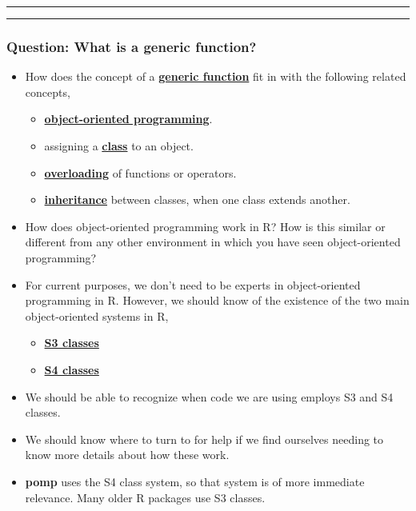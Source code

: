 \documentclass[]{article}
\begin{document}
\begin{center}\rule{0.5\linewidth}{\linethickness}\end{center}

\begin{center}\rule{0.5\linewidth}{\linethickness}\end{center}

\subsubsection{Question: What is a generic
function?}\label{question-what-is-a-generic-function}

\begin{itemize}
\item
  How does the concept of a
  \href{https://en.wikipedia.org/wiki/Generic_function}{\textbf{generic
  function}} fit in with the following related concepts,

  \begin{itemize}
  \item
    \href{https://en.wikipedia.org/wiki/Object-oriented_programming}{\textbf{object-oriented
    programming}}.
  \item
    assigning a
    \href{https://en.wikipedia.org/wiki/Class_\%28computer_programming\%29}{\textbf{class}}
    to an object.
  \item
    \href{https://en.wikipedia.org/wiki/Function_overloading}{\textbf{overloading}}
    of functions or operators.
  \item
    \href{https://en.wikipedia.org/wiki/Inheritance_\%28object-oriented_programming\%29}{\textbf{inheritance}}
    between classes, when one class extends another.
  \end{itemize}
\item
  How does object-oriented programming work in R? How is this similar or
  different from any other environment in which you have seen
  object-oriented programming?
\item
  For current purposes, we don't need to be experts in object-oriented
  programming in R. However, we should know of the existence of the two
  main object-oriented systems in R,

  \begin{itemize}
  \item
    \href{http://adv-r.had.co.nz/OO-essentials.html\#s3}{\textbf{S3
    classes}}
  \item
    \href{http://adv-r.had.co.nz/S4.html}{\textbf{S4 classes}}
  \end{itemize}
\item
  We should be able to recognize when code we are using employs S3 and
  S4 classes.
\item
  We should know where to turn to for help if we find ourselves needing
  to know more details about how these work.
\item
  \textbf{pomp} uses the S4 class system, so that system is of more
  immediate relevance. Many older R packages use S3 classes.
\end{itemize}
\end{document}
